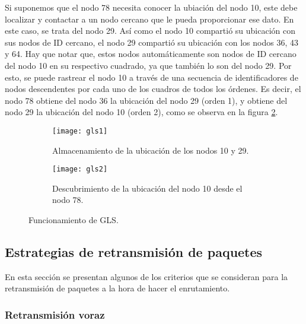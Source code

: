 Si suponemos que el nodo 78 necesita conocer la ubiación del nodo 10, este debe
localizar y contactar a un nodo cercano que le pueda proporcionar ese dato. En
este caso, se trata del nodo 29. Así como el nodo 10 compartió su ubicación con
sus nodos de ID cercano, el nodo 29 compartió su ubicación con los nodos 36, 43
y 64. Hay que notar que, estos nodos automáticamente son nodos de ID cercano del
nodo 10 en su respectivo cuadrado, ya que también lo son del nodo 29. Por esto,
se puede rastrear el nodo 10 a través de una secuencia de identificadores de
nodos descendentes por cada uno de los cuadros de todos los órdenes. Es decir,
el nodo 78 obtiene del nodo 36 la ubicación del nodo 29 (orden 1), y obtiene
del nodo 29 la ubicación del nodo 10 (orden 2), como se observa en la figura
\ref{fig:gls2}.

\begin{figure}[th]
\centering

\begin{subfigure}[b]{\textwidth}
\centering
\texttt{[image: gls1]}
\caption{Almacenamiento de la ubicación de los nodos 10 y 29.}
\label{fig:gls1}
\end{subfigure}
\hfill
\begin{subfigure}[b]{\textwidth}
\centering
\texttt{[image: gls2]}
\caption{Descubrimiento de la ubicación del nodo 10 desde el nodo 78.}
\label{fig:gls2}
\end{subfigure}

\decoRule
\caption[Funcionamiento de GLS]{Funcionamiento de GLS\protect\footnotemark.}
\label{fig:gls}
\end{figure}


\subsection{Estrategias de retransmisión de paquetes}
\label{subsec:estrategias_de_retransmision_de_paquetes}

En esta sección se presentan algunos de los criterios que se consideran para la
retransmisión de paquetes a la hora de hacer el enrutamiento.

\subsubsection{Retransmisión voraz}
\label{subsubsec:retransmision_voraz}


